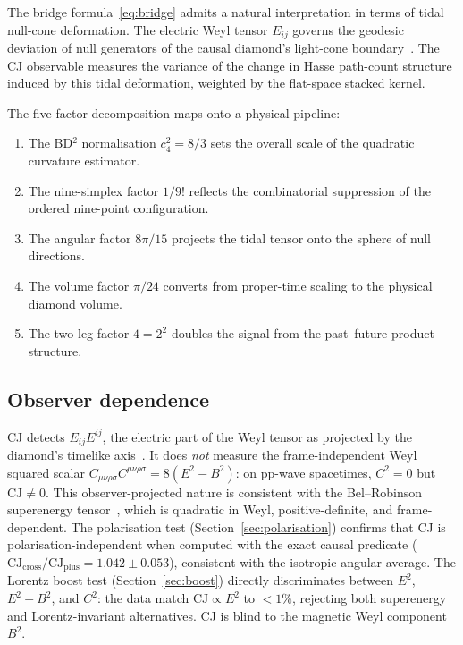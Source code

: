 \documentclass[12pt,a4paper]{article}
\theoremstyle{plain}
\theoremstyle{definition}
\theoremstyle{remark}
\newcommand{\Esq}{E_{ij}E^{ij}}
\newcommand{\CJ}{\mathrm{CJ}}
\begin{document}
The bridge formula~\eqref{eq:bridge} admits a natural
interpretation in terms of tidal null-cone deformation.  The
electric Weyl tensor $E_{ij}$ governs the geodesic deviation of
null generators of the causal diamond's light-cone
boundary~\cite{Poisson:2011}.  The CJ observable measures the
variance of the change in Hasse path-count structure induced by
this tidal deformation, weighted by the flat-space stacked kernel.

The five-factor decomposition maps onto a physical pipeline:
\begin{enumerate}
\item The BD${}^2$ normalisation $c_4^2 = 8/3$ sets the overall
  scale of the quadratic curvature estimator.
\item The nine-simplex factor $1/9!$ reflects the combinatorial
  suppression of the ordered nine-point configuration.
\item The angular factor $8\pi/15$ projects the tidal tensor onto
  the sphere of null directions.
\item The volume factor $\pi/24$ converts from proper-time
  scaling to the physical diamond volume.
\item The two-leg factor $4 = 2^2$ doubles the signal from the
  past--future product structure.
\end{enumerate}

\subsection{Observer dependence}

CJ detects $\Esq$, the electric part of the Weyl tensor as
projected by the diamond's timelike
axis~\cite{Ehlers:1961,PenroseRindler:1984}.  It does
\emph{not} measure the frame-independent Weyl squared scalar
$C_{\mu\nu\rho\sigma}C^{\mu\nu\rho\sigma} = 8(E^2 - B^2)$:
on pp-wave spacetimes, $C^2 = 0$ but $\CJ \neq 0$.  This
observer-projected nature is consistent with the Bel--Robinson
superenergy tensor~\cite{Senovilla:2000}, which is quadratic in
Weyl, positive-definite, and frame-dependent.  The polarisation test (Section~\ref{sec:polarisation}) confirms
that CJ is polarisation-independent when computed with the exact
causal predicate ($\CJ_{\mathrm{cross}}/\CJ_{\mathrm{plus}}
= 1.042 \pm 0.053$), consistent with the isotropic angular average.
The Lorentz boost test (Section~\ref{sec:boost}) directly
discriminates between $E^2$, $E^2 + B^2$, and $C^2$: the data
match $\CJ \propto E^2$ to $< 1\%$, rejecting both superenergy
and Lorentz-invariant alternatives.  CJ is blind to the magnetic
Weyl component~$B^2$.
\end{document}
